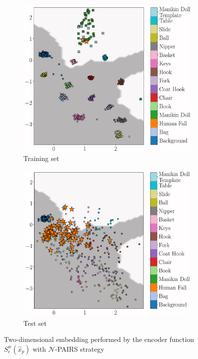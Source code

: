 \begin{figure}[H]
	\centering
	\begin{subfigure}[b]{0.475\textwidth}   
		\centering 
		\includegraphics[width=\textwidth]{img/eeai/embedding/negative_template_pairs_only/fold_4_train}
		\caption[]%
		{Training set}    
		\label{fig:train-n-pairs}
	\end{subfigure}
	\quad
	\begin{subfigure}[b]{0.475\textwidth}   
		\centering 
		\includegraphics[width=\textwidth]{img/eeai/embedding/negative_template_pairs_only/fold_4_moquette}
		\caption[]%
		{Test set}    
		\label{fig:test-n-pairs}
	\end{subfigure}
	\caption[]
	{\small Two-dimensional embedding performed by the encoder function $S_e^w(\hat{x}_{p})$ with $\mathcal{N}$-PAIRS strategy} 
	\label{fig:n-pairs}
\end{figure}

